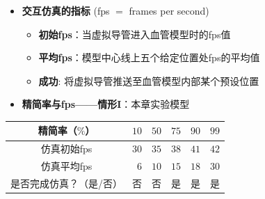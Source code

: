 \begin{frame}
\begin{itemize}
\item \textbf{交互仿真的指标} (fps $=$ frames per second)
\begin{itemize}
\item \textbf{初始fps}：当虚拟导管进入血管模型时的fps值
\item \textbf{平均fps}：模型中心线上五个给定位置处fps的平均值
\item \textbf{成功}: 将虚拟导管推送至血管模型内部某个预设位置
\end{itemize}
\end{itemize}
\end{frame}

\begin{frame}
\begin{itemize}
  \item \textbf{精简率与fps——情形I}：本章实验模型
\end{itemize}
\begin{table}[t]
\renewcommand{\arraystretch}{0.5}
\centering
\begin{tabular*}{90mm}{c r r r r r}
\toprule
\hspace{5mm} \small{精简率（$\%$）}           & \small{$10$} & \small{$50$} & \small{$75$} & \small{$90$} & \small{$99$} \\
\midrule
\hspace{5mm} \small{仿真初始fps}              & \small{$30$} & \small{$35$} & \small{$38$} & \small{$41$} & \small{$42$} \\
\midrule
\hspace{5mm} \small{仿真平均fps}              &  \small{$6$} & \small{$10$} & \small{$15$} & \small{$18$} & \small{$30$} \\
\midrule
\hspace{5mm} \small{是否完成仿真？（是/否）}  &  \small{否}  &  \small{否}  & \small{是}   & \small{是}   & \small{是}   \\
\bottomrule
\end{tabular*}
\end{table}
\end{frame}

